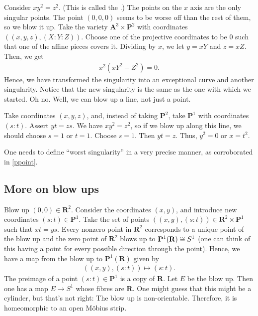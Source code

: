 \documentclass [11 pt, oneside, margin = 1 in] {article}
\begin{document}
\begin{example}\label{ppoint}\text{}
Consider $xy^2=z^2$. (This is called the .) The points on the $x$ axis are the only singular points. The point $(0,0,0)$ seems to be worse off than the rest of them, so we blow it up. Take the variety $\mathbf{A}^3 \times \mathbf{P}^2$ with coordinates $((x,y,z),  (X:Y:Z))$. Choose one of the projective coordinates to be $0$ such that one of the affine pieces covers it. Dividing by $x$, we let $y=xY$ and $z=xZ$. Then, we get
\begin{align*}
	x^2(xY^2-Z^2)=0.
\end{align*}
Hence, we have transformed the singularity into an exceptional curve and another singularity. Notice that the new singularity is the same as the one with which we started. Oh no. Well, we can blow up a line, not just a point.

Take coordinates $(x,y,z)$, and, instead of taking $\mathbf{P}^2$, take $\mathbf{P}^1$ with coordinates $(s:t)$. Assert $yt=zs$. We have $xy^2=z^2$, so if we blow up along this line, we should choose $s=1$ or $t=1$. Choose $s=1$. Then $yt=z$. Thus, $y^2=0$ or $x=t^2$.
\end{example}

\begin{warn}
	One needs to define ``worst singularity'' in a very precise manner, as corroborated in \cref{ppoint}. 
\end{warn}

\subsection{More on blow ups}
\begin{example}\label{}\text{}
Blow up $(0,0)\in  \mathbf{R}^2$. Consider the coordinates $(x,y)$, and introduce new coordinates $(s:t) \in \mathbf{P}^1$. Take the set of points $((x,y), (s:t)) \in \mathbf{R}^2\times \mathbf{P}^1$ such that $xt=ys$. Every nonzero point in $\mathbf{R}^2$ corresponds to a unique point of the blow up and the zero point of $\mathbf{R}^2$ blows up to $\mathbf{P}^1(\mathbf{R})\cong S^1$  (one can think of this having a point for every possible direction through the point). Hence, we have a map from the blow up to $\mathbf{P}^1(\mathbf{R})$ given by
\begin{align*}
	((x,y),  (s:t)) \longmapsto (s:t).
\end{align*}
The preimage of a point $(s:t) \in \mathbf{P}^1$ is a copy of $\mathbf{R}$. Let $E$ be the blow up. Then one has a map $E\longrightarrow S^1$ whose fibres are $\mathbf{R}$. One might guess that this might be a cylinder, but that's not right: The blow up is non-orientable. Therefore, it is homeomorphic to an open M\"obius strip. 
\end{example}
\end{document}
